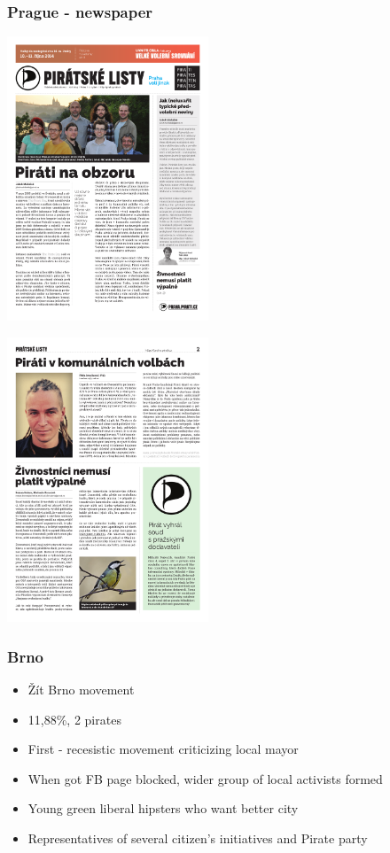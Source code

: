\begin{frame}
	\frametitle{Prague - newspaper}
	\begin{center}
	\begin{multicols}{2}
		\includegraphics[width = 0.45\textwidth]{listy1.pdf}
		
		\includegraphics[width = 0.45\textwidth]{listy2.pdf}
	\end{multicols}
	\end{center}
\end{frame}
\begin{frame}
	\frametitle{Brno}
	\begin{itemize}
		\item \v{Z}\'it Brno movement
		\item 11,88\%, 2 pirates
		\item First - recesistic movement criticizing local mayor
		\item When got FB page blocked, wider group of local activists formed
		\item Young green liberal hipsters who want better city
		\item Representatives of several citizen's initiatives and Pirate party
	\end{itemize}
\end{frame}
